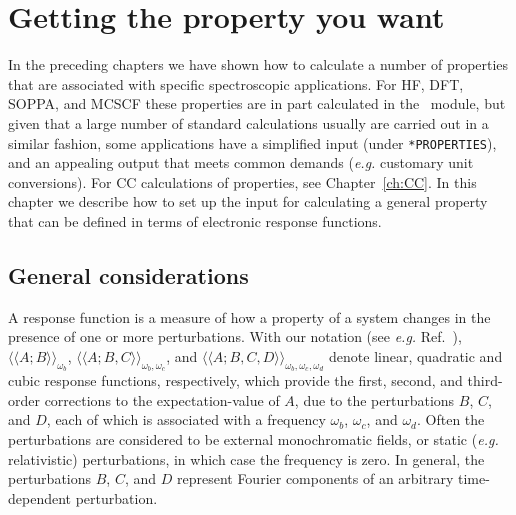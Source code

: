 \chapter{Getting the property you want}\label{ch:rspchap}


In the preceding chapters we have shown how to calculate a number of
properties that are associated with specific spectroscopic applications.
For HF, DFT, SOPPA, and MCSCF these properties are in part
calculated in the \resp\ module, but given that a large number of
standard calculations usually are carried out in a similar fashion, some
applications have a simplified input (under {\tt **PROPERTIES}),
and an appealing output that meets common demands
({\it e.g.\/} customary unit conversions).
For CC calculations of properties, see Chapter~\ref{ch:CC}.
In this chapter we
describe how to set up the input for calculating a general property that
can be defined in terms of electronic response functions.

\section{General considerations}
\label{sec:rspgen}

\begin{center}
\end{center}

A response function is a measure of how a property of a system changes in
the presence of one or more perturbations. With our notation (see {\it e.g.\/}
Ref.~\cite{jopjjcp82}),  $\langle\!\langle A;B\rangle\!\rangle_{\omega_b}$,
$\langle\!\langle A;B,C\rangle\!\rangle_{\omega_b,\omega_c}$, and
$\langle\!\langle A;B,C,D\rangle\!\rangle_{\omega_b,\omega_c,\omega_d}$
denote linear, quadratic and cubic response
functions, respectively, which
provide the first, second, and third-order corrections to the
expectation-value of $A$, due to the perturbations $B$, $C$, and $D$, each of
which is associated with a frequency $\omega_b$, $\omega_c$, and
$\omega_d$. Often the perturbations are considered to be
external monochromatic fields, or static ({\it e.g.\/} relativistic) perturbations,
in which case the frequency is zero.   In general, the perturbations $B$,
$C$, and $D$ represent Fourier components of an arbitrary time-dependent
perturbation.

